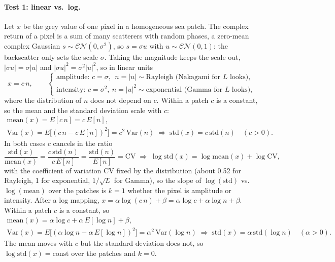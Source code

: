 \documentclass[11pt,a4paper]{article}
\begin{document}
\paragraph{Test 1: linear vs.\ log.} Let $x$ be the grey value of one pixel in a homogeneous sea patch. The complex return of
a pixel is a sum of many scatterers with random phases, a zero-mean complex Gaussian $s \sim \mathcal{CN}(0,\sigma^2)$, so
$s = \sigma u$ with $u \sim \mathcal{CN}(0,1)$: the backscatter only sets the scale $\sigma$. Taking the magnitude keeps the scale
out, $|\sigma u| = \sigma|u|$ and $|\sigma u|^2 = \sigma^2|u|^2$, so in linear units
\[
  x = c\, n, \qquad
  \begin{cases}
    \text{amplitude: } c = \sigma,\ \ n = |u| \sim \text{Rayleigh (Nakagami for } L \text{ looks)},\\
    \text{intensity: } c = \sigma^2,\ n = |u|^2 \sim \text{exponential (Gamma for } L \text{ looks)},
  \end{cases}
\]
where the distribution of $n$ does not depend on $c$.
Within a patch $c$ is a constant, so the mean and the standard deviation scale with $c$:
\begin{gather*}
  \mathrm{mean}(x) = E[c\,n] = c\,E[n], \\
  \mathrm{Var}(x) = E\bigl[(c\,n - c\,E[n])^2\bigr] = c^2\,\mathrm{Var}(n)
  \;\Rightarrow\; \mathrm{std}(x) = c\,\mathrm{std}(n) \quad (c > 0).
\end{gather*}
In both cases $c$ cancels in the ratio
\[
  \frac{\mathrm{std}(x)}{\mathrm{mean}(x)} = \frac{c\,\mathrm{std}(n)}{c\,E[n]} = \frac{\mathrm{std}(n)}{E[n]} = \mathrm{CV}
  \;\Rightarrow\; \log\mathrm{std}(x) = \log\mathrm{mean}(x) + \log\mathrm{CV},
\]
with the coefficient of variation CV fixed by the distribution (about 0.52 for Rayleigh, 1 for exponential, $1/\sqrt L$ for Gamma),
so the slope of $\log(\mathrm{std})$ vs.\ $\log(\mathrm{mean})$ over the patches is $k = 1$ whether the pixel is amplitude or intensity.
After a log mapping, $x = \alpha\log(c\,n) + \beta = \alpha\log c + \alpha\log n + \beta$. Within a patch $c$ is a constant, so
\begin{gather*}
  \mathrm{mean}(x) = \alpha\log c + \alpha\,E[\log n] + \beta, \\
  \mathrm{Var}(x) = E\bigl[(\alpha\log n - \alpha\,E[\log n])^2\bigr] = \alpha^2\,\mathrm{Var}(\log n)
  \;\Rightarrow\; \mathrm{std}(x) = \alpha\,\mathrm{std}(\log n) \quad (\alpha > 0).
\end{gather*}
The mean moves with $c$ but the standard deviation does not, so $\log\mathrm{std}(x) = \text{const}$ over the patches and $k = 0$.
\end{document}
